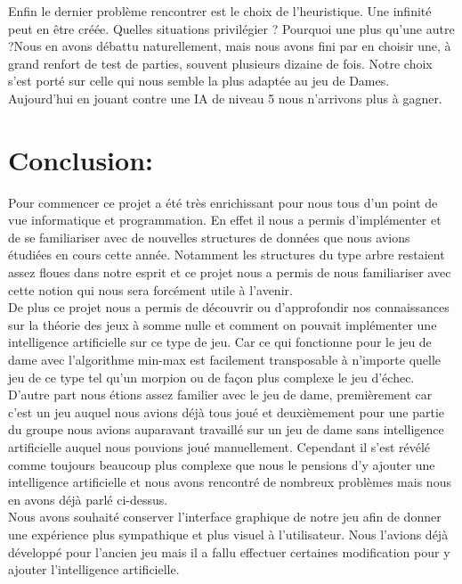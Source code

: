 \documentclass[12,french]{report}
\begin{document}
Enfin le dernier problème rencontrer est le choix de l'heuristique. Une infinité peut en être créée. Quelles situations privilégier ? Pourquoi une plus qu'une autre ?Nous en avons débattu naturellement, mais nous avons fini par en choisir une, à grand renfort de test de parties, souvent plusieurs dizaine de fois. Notre choix s'est porté sur celle qui nous semble la plus adaptée au jeu de Dames. Aujourd'hui en jouant contre une IA de niveau 5 nous n'arrivons plus à gagner.



\chapter*{Conclusion:}

Pour commencer ce projet a été très enrichissant pour nous tous d'un point de vue informatique et programmation. En effet il nous a permis d'implémenter et de se familiariser avec de nouvelles structures de données que nous avions étudiées en cours cette année. Notamment les structures du type arbre restaient assez floues dans notre esprit et ce projet nous a permis de nous familiariser avec cette notion qui nous sera forcément utile à l'avenir.\\
De plus ce projet nous a permis de découvrir ou d'approfondir nos connaissances sur la théorie des jeux à somme nulle et comment on pouvait implémenter une intelligence artificielle sur ce type de jeu. Car ce qui fonctionne pour le jeu de dame avec l'algorithme min-max est facilement transposable à n'importe quelle jeu de ce type tel qu'un morpion ou de façon plus complexe le jeu d'échec.\\

D'autre part nous étions assez familier avec le jeu de dame, premièrement car c'est un jeu auquel nous avions déjà tous joué et deuxièmement pour une partie du groupe nous avions auparavant travaillé sur un jeu de dame sans intelligence artificielle auquel nous pouvions joué manuellement. Cependant il s'est révélé comme toujours beaucoup plus complexe que nous le pensions d'y ajouter une intelligence artificielle et nous avons rencontré de nombreux problèmes mais nous en avons déjà parlé ci-dessus.\\

Nous avons souhaité conserver l'interface graphique de notre jeu afin de donner une expérience plus sympathique et plus visuel à l'utilisateur. Nous l'avions déjà développé pour l'ancien jeu mais il a fallu effectuer certaines modification pour y ajouter l'intelligence artificielle.\\
\end{document}
